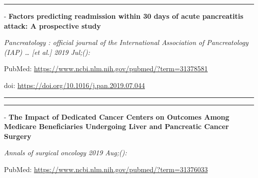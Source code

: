 \documentclass[]{article}
\begin{document}
\begin{center}\rule{0.5\linewidth}{\linethickness}\end{center}

 - \textbf{Factors predicting readmission within 30 days of acute
pancreatitis attack: A prospective study}

\emph{Pancreatology : official journal of the International Association
of Pancreatology (IAP) \ldots{} {[}et al.{]} 2019 Jul;():}

PubMed: \url{https://www.ncbi.nlm.nih.gov/pubmed/?term=31378581}

doi: \url{https://doi.org/10.1016/j.pan.2019.07.044}

{}

{}

\begin{center}\rule{0.5\linewidth}{\linethickness}\end{center}

\begin{center}\rule{0.5\linewidth}{\linethickness}\end{center}

 - \textbf{The Impact of Dedicated Cancer Centers on Outcomes Among
Medicare Beneficiaries Undergoing Liver and Pancreatic Cancer Surgery}

\emph{Annals of surgical oncology 2019 Aug;():}

PubMed: \url{https://www.ncbi.nlm.nih.gov/pubmed/?term=31376033}
\end{document}

